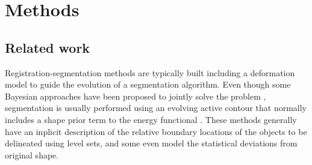 %
%
%
%


\section{Methods}
\label{sec:methods}
%
\subsection{Related work}
\label{sec:methods_background}
Registration-segmentation methods are typically built including a deformation
  model to guide the evolution of a segmentation algorithm.
Even though some Bayesian approaches have been proposed to jointly solve the problem
  \citep{wyatt_map_2003,gass_simultaneous_2014}, segmentation is usually performed using
  an evolving active contour \citep{chan_active_2001} that normally includes a shape prior
  term to the energy functional \citep{chen_using_2002,bresson_variational_2006,
  chan_level_2005,cremers_kernel_2006,gastaud_combining_2004}.
These methods generally have an inplicit description of the relative boundary locations of the objects
  to be delineated using level sets, and some even model the statistical deviations from original
  shape.


